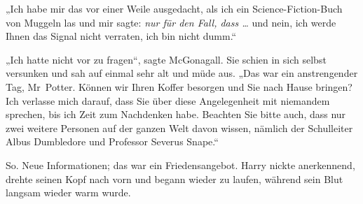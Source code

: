 „Ich habe mir das vor einer Weile ausgedacht, als ich ein Science-Fiction-Buch von Muggeln las und mir sagte: \emph{nur für den Fall, dass …} und nein, ich werde Ihnen das Signal nicht verraten, ich bin nicht dumm.“

„Ich hatte nicht vor zu fragen“, sagte McGonagall. Sie schien in sich selbst versunken und sah auf einmal sehr alt und müde aus.
„Das war ein anstrengender Tag, Mr~Potter. Können wir Ihren Koffer besorgen und Sie nach Hause bringen? Ich verlasse mich darauf, dass Sie über diese Angelegenheit mit niemandem sprechen, bis ich Zeit zum Nachdenken habe. Beachten Sie bitte auch, dass nur zwei weitere Personen auf der ganzen Welt davon wissen, nämlich der Schulleiter Albus Dumbledore und Professor Severus Snape.“

So. Neue Informationen; das war ein Friedensangebot. Harry nickte anerkennend, drehte seinen Kopf nach vorn und begann wieder zu laufen, während sein Blut langsam wieder warm wurde.

